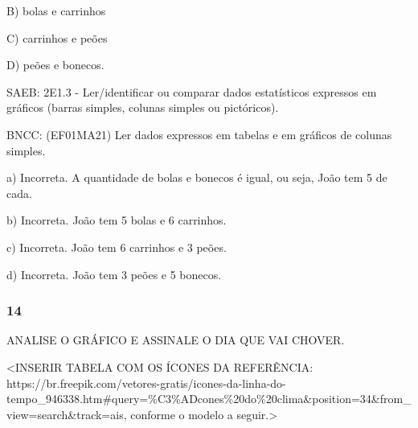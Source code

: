 B) bolas e carrinhos

C) carrinhos e peões

D) peões e bonecos.

SAEB: 2E1.3 - Ler/identificar ou comparar dados estatísticos expressos
em gráficos (barras simples, colunas simples ou pictóricos).

BNCC: (EF01MA21) Ler dados expressos em tabelas e em gráficos de colunas
simples.

a) Incorreta. A quantidade de bolas e bonecos é igual, ou seja, João tem
5 de cada.

b) Incorreta. João tem 5 bolas e 6 carrinhos.

c) Incorreta. João tem 6 carrinhos e 3 peões.

d) Incorreta. João tem 3 peões e 5 bonecos.

\subsubsection{14 }\label{section-115}

ANALISE O GRÁFICO E ASSINALE O DIA QUE VAI CHOVER.

\textless{}INSERIR TABELA COM OS ÍCONES DA REFERÊNCIA:
https://br.freepik.com/vetores-gratis/icones-da-linha-do-tempo\_946338.htm\#query=\%C3\%ADcones\%20do\%20clima\&position=34\&from\_view=search\&track=ais,
conforme o modelo a seguir.\textgreater{}

